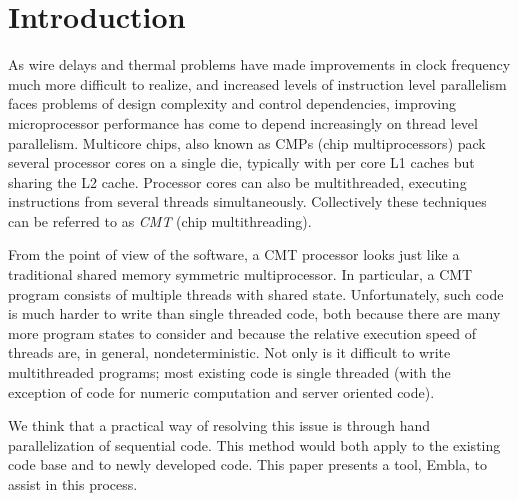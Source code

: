 \section{Introduction}

As wire delays and thermal problems have made improvements in clock
frequency much more difficult to realize, and increased levels of
instruction level parallelism faces problems of design complexity and
control dependencies, improving microprocessor performance has come to
depend increasingly on thread level parallelism. Multicore chips, also
known as CMPs (chip multiprocessors) pack several processor cores on a
single die, typically with per core L1 caches but sharing the L2
cache. Processor cores can also be multithreaded, executing
instructions from several threads simultaneously. Collectively 
these techniques can be referred to as {\em CMT} (chip multithreading).

From the point of view of the software, a CMT processor looks just
like a traditional shared memory symmetric multiprocessor. In particular, a CMT
program consists of multiple threads with shared state. 
Unfortunately, such code is much
harder to write than single threaded code, both because there are many
more program states to consider and because the relative execution
speed of threads are, in general, nondeterministic.  Not only is it
difficult to write multithreaded programs; most existing code is
single threaded (with the exception of code for numeric computation
and server oriented code).

We think that a practical way of resolving this issue is through hand
parallelization of sequential code. This method would both apply to
the existing code base and to newly developed code. This paper
presents a tool, Embla, to assist in this process.


